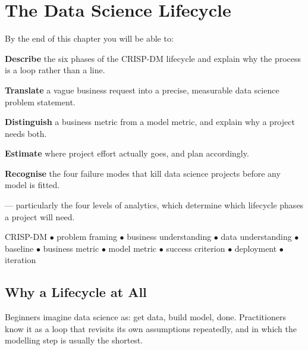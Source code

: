 \chapter{The Data Science Lifecycle}\label{ch:lifecycle}

\begin{outcomes}
By the end of this chapter you will be able to:
\begin{tight}
  \item \textbf{Describe} the six phases of the CRISP-DM lifecycle and explain why the process is a loop rather than a line.
  \item \textbf{Translate} a vague business request into a precise, measurable data science problem statement.
  \item \textbf{Distinguish} a business metric from a model metric, and explain why a project needs both.
  \item \textbf{Estimate} where project effort actually goes, and plan accordingly.
  \item \textbf{Recognise} the four failure modes that kill data science projects before any model is fitted.
\end{tight}
\end{outcomes}

\begin{prereq}
 --- particularly the four levels of analytics, which determine
which lifecycle phases a project will need.
\end{prereq}

\begin{keyterms}
CRISP-DM $\bullet$ problem framing $\bullet$ business understanding $\bullet$ data
understanding $\bullet$ baseline $\bullet$ business metric $\bullet$ model metric
$\bullet$ success criterion $\bullet$ deployment $\bullet$ iteration
\end{keyterms}

\section{Why a Lifecycle at All}

Beginners imagine data science as: get data, build model, done. Practitioners
know it as a loop that revisits its own assumptions repeatedly, and in which the
modelling step is usually the shortest.

